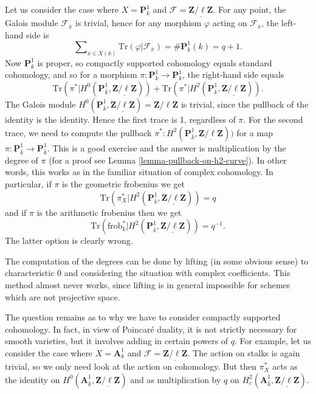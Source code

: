 \medskip\noindent
Let us consider the case where $X = \mathbf{P}^1_k$ and $\mathcal{F} =
\underline{\mathbf{Z}/\ell\mathbf{Z}}$. For any point, the Galois module
$\mathcal{F}_{\bar x}$ is trivial, hence for any morphism $\varphi$ acting on
$\mathcal{F}_{\bar x}$, the left-hand side is
$$
\sum\nolimits_{x \in X(k)} \text{Tr}(\varphi | \mathcal{F}_{\bar x}) =
\#\mathbf{P}^1_k(k) = q+1.
$$
Now $\mathbf{P}^1_k$ is proper, so compactly supported cohomology equals
standard cohomology, and so for a morphism $\pi : \mathbf{P}^1_k \to
\mathbf{P}^1_k$, the right-hand side equals
$$
\text{Tr}(\pi^* | H^0 (\mathbf{P}^1_{\bar k},
\underline{\mathbf{Z}/\ell\mathbf{Z}})) + \text{Tr}(\pi^* | H^2
(\mathbf{P}^1_{\bar k}, \underline{\mathbf{Z}/\ell\mathbf{Z}})).
$$
The Galois module $H^0 (\mathbf{P}^1_{\bar k},
\underline{\mathbf{Z}/\ell\mathbf{Z}}) = \mathbf{Z}/\ell\mathbf{Z}$ is trivial,
since the pullback of the identity is the identity. Hence the first trace is 1,
regardless of $\pi$. For the second trace, we need to compute the pullback
$\pi^* : H^2(\mathbf{P}^1_{\bar k}, \underline{\mathbf{Z}/\ell\mathbf{Z}}))$
for a map $\pi : \mathbf{P}^1_{\bar k} \to \mathbf{P}^1_{\bar k}$. This is a
good exercise and the answer is multiplication by the degree of $\pi$
(for a proof see Lemma \ref{lemma-pullback-on-h2-curve}). In other
words, this works as in the familiar situation of complex cohomology. In
particular, if $\pi$ is the geometric frobenius we get
$$
\text{Tr}(\pi_X^* | H^2 (\mathbf{P}^1_{\bar k},
\underline{\mathbf{Z}/\ell\mathbf{Z}})) = q
$$
and if $\pi$ is the arithmetic frobenius then we get
$$
\text{Tr}(\text{frob}_k^* | H^2 (\mathbf{P}^1_{\bar k},
\underline{\mathbf{Z}/\ell\mathbf{Z}})) = q^{-1}.
$$
The latter option is clearly wrong.

\begin{remark}
\label{remark-compute-degree-lifting}
The computation of the degrees can be done by lifting (in some obvious sense)
to characteristic 0 and considering the situation with complex coefficients.
This method almost never works, since lifting is in general impossible for
schemes which are not projective space.
\end{remark}

\noindent
The question remains as to why we have to consider compactly supported
cohomology. In fact, in view of Poincar\'e duality, it is not strictly
necessary for smooth varieties, but it involves adding in certain powers
of $q$. For example, let us consider the case where
$X = \mathbf{A}^1_k$ and
$\mathcal{F} = \underline{\mathbf{Z}/\ell\mathbf{Z}}$.
The action on stalks is again trivial, so we only need look at the action
on cohomology. But then $\pi_X^*$ acts as the identity on
$H^0(\mathbf{A}^1_{\bar k}, \underline{\mathbf{Z}/\ell\mathbf{Z}})$
and as multiplication by $q$ on
$H^2_c(\mathbf{A}^1_{\bar k}, \underline{\mathbf{Z}/\ell\mathbf{Z}})$.




